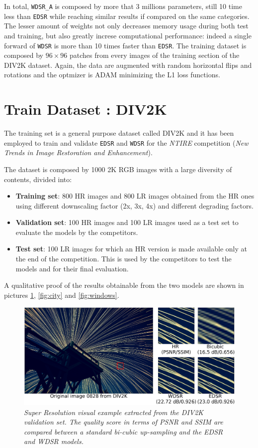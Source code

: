 \documentclass[12pt,a4paper]{report}
\begin{document}
In total, {\tt WDSR\_A} is composed by more that 3 millions parameters, still 10 time less than {\tt EDSR} while reaching similar results if compared on the same categories.
The lesser amount of weights not only decreases memory usage during both test and training, but also greatly increse computational performance: indeed a single forward of {\tt WDSR} is more than 10 times faster than {\tt EDSR}.
The training dataset is composed by $96 \times 96$ patches from every images of the training section of the DIV2K dataset. Again, the data are augmented with random horizontal flips and rotations and the optmizer is ADAM \cite{adam} minimizing the L1 loss functions.

\section{Train Dataset : DIV2K}

The training set is a general purpose dataset called DIV2K \cite{DIV2K} and it has been employed to train and validate {\tt EDSR} and {\tt WDSR} for the {\it NTIRE} competition ({\it New Trends in Image Restoration and Enhancement}).

The dataset is composed by 1000 2K RGB images with a large diversity of contents, divided into:

\begin{itemize}
 \setlength\itemsep{-0.2em}
 \item {\bf Training set}: 800 HR images and 800 LR images obtained from the HR ones using different downscaling factor (2x, 3x, 4x) and different degrading factors.
 \item {\bf Validation set}: 100 HR images and 100 LR images used as a test set to evaluate the models by the competitors.
 \item {\bf Test set}: 100 LR images for which an HR version is made available only at the end of the competition. This is used by the competitors to test the models and for their final evaluation.
\end{itemize}

A qualitative proof of the results obtainable from the two models are shown in pictures \ref{fig:sky}, \ref{fig:city} and \ref{fig:windows}.

\begin{figure}[H]
  \includegraphics[scale=0.5]{images/sr_res1.png}
    \caption{\it Super Resolution visual example extracted from the DIV2K validation set. The quality score in terms of PSNR and SSIM are compared between a standard bi-cubic up-sampling and the EDSR and WDSR models.}
  \label{fig:sky}
\end{figure}
\end{document}
